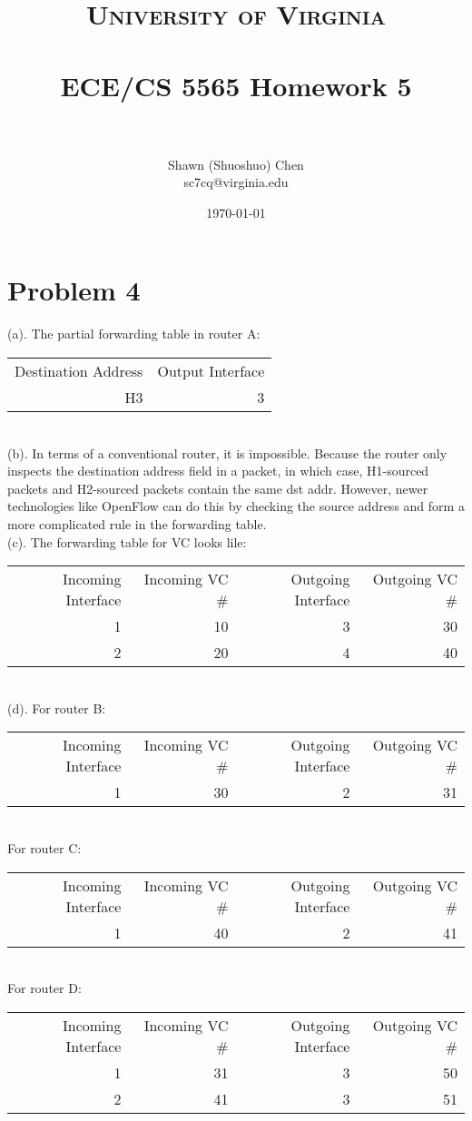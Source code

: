\documentclass[titlepage, paper=a4, fontsize=11pt]{scrartcl} %
\title{	
\normalfont \normalsize 
\textsc{University of Virginia} \\ [25pt] %
\horrule{0.5pt} \\[0.4cm] %
\huge ECE/CS 5565 Homework 5 \\ %
\horrule{2pt} \\[0.5cm] %
}
\author{Shawn (Shuoshuo) Chen\\sc7cq@virginia.edu} %
\date{\normalsize\today} %
\numberwithin{equation}{section} %
\numberwithin{table}{section} %
\begin{document}
\maketitle %


\section*{Problem 4}
(a).
The partial forwarding table in router A: \\
\begin{tabular}{ r | r }
  Destination Address & Output Interface \\
  H3 & 3 \\
\end{tabular}
\\

(b).
In terms of a conventional router, it is impossible. Because the router only inspects the destination address field in a packet, in which case, H1-sourced packets and H2-sourced packets contain the same dst addr. However, newer technologies like OpenFlow can do this by checking the source address and form a more complicated rule in the forwarding table.
\\

(c).
The forwarding table for VC looks lile: \\
\begin{tabular}{ r | r | r | r }
  Incoming Interface & Incoming VC \# & Outgoing Interface & Outgoing VC \# \\
  1 & 10 & 3 & 30 \\
  2 & 20 & 4 & 40 \\
\end{tabular}
\\

(d).
For router B: \\
\begin{tabular}{ r | r | r | r }
  Incoming Interface & Incoming VC \# & Outgoing Interface & Outgoing VC \# \\
  1 & 30 & 2 & 31 \\
\end{tabular}
\\
For router C: \\
\begin{tabular}{ r | r | r | r }
  Incoming Interface & Incoming VC \# & Outgoing Interface & Outgoing VC \# \\
  1 & 40 & 2 & 41 \\
\end{tabular}
\\
For router D: \\
\begin{tabular}{ r | r | r | r }
  Incoming Interface & Incoming VC \# & Outgoing Interface & Outgoing VC \# \\
  1 & 31 & 3 & 50 \\
  2 & 41 & 3 & 51 \\
\end{tabular}
\\
\end{document}
